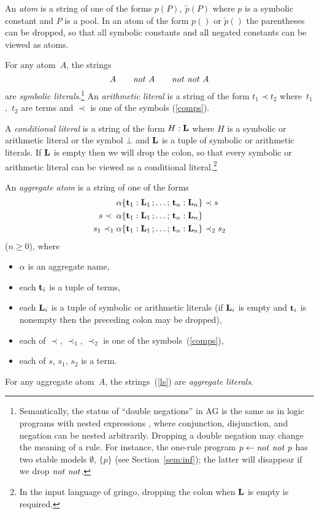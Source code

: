 \documentclass{tlp}
\def\ar{\leftarrow}
\def\beq{\begin{equation}}
\def\eeq#1{\label{#1}\end{equation}}
\def\no{{\it not}}
\begin{document}
An {\sl atom} is a string of one of the forms
$p(P),\ \tilde{p}(P)$
where $p$ is a symbolic constant and $P$ is a pool.
In an atom of the form $p()$ or $\tilde{p}()$ the parentheses can be
dropped, so that all symbolic constants and all negated constants can be viewed
as atoms.

For any atom~$A$, the strings
\beq
A\qquad\no\ A\qquad\no\ \no\ A
\eeq{ls}
are {\sl symbolic literals}.\footnote{Semantically, the status of
``double negations'' in AG is the same as in logic programs with
nested expressions \cite{lif99d}, where conjunction, disjunction, and
negation can be nested arbitrarily.
Dropping a double negation may change the meaning of a rule.  For
instance, the one-rule program $p\ar \no\ \no\ p$ has two stable models
$\emptyset$, $\{p\}$ (see Section~\ref{sem:inf}); the latter will disappear
if we drop $\no\ \no$.} An {\sl arithmetic literal} is
a string of the form $t_1\prec t_2$
where~$t_1$,~$t_2$ are terms and $\prec$ is one of the symbols (\ref{comps}).

A {\sl conditional literal} is a string of the form
$H : {\bf L}$
where $H$ is a symbolic or arithmetic literal or the symbol $\bot$ and
${\bf L}$ is a tuple of symbolic or arithmetic literals.
If ${\bf L}$ is empty then we will drop the colon, so that every symbolic or
arithmetic literal
can be viewed as a conditional literal.\footnote{In the input language of
{\sc gringo}, dropping the colon when ${\bf L}$ is empty is required.}

An {\sl aggregate atom} is a string of one of the forms
\begin{align}
       \alpha\{{\bf t}_1 : {\bf L}_1\,;\ldots;\,{\bf t}_n : {\bf L}_n\}&\prec s
\label{ag1}\\
s\prec\;\alpha\{{\bf t}_1 : {\bf L}_1\,;\ldots;\,{\bf t}_n : {\bf L}_n\}&
\label{ag2}\\
s_1\prec_1\alpha\{{\bf t}_1 : {\bf L}_1\,;\ldots;\,{\bf t}_n : {\bf L}_n\}&
                                                              \prec_2s_2
\label{ag3}
\end{align}
($n\geq 0$),
where
\begin{itemize}
\item
$\alpha$ is an aggregate name,
\item
each ${\bf t}_i$ is a tuple of terms,
\item
each ${\bf L}_i$ is a tuple of symbolic or arithmetic literals (if
${\bf L}_i$ is empty and ${\bf t}_i$ is nonempty then the preceding colon may
be dropped),
\item
each of $\prec$, $\prec_1$, $\prec_2$ is one of the
symbols~(\ref{comps}),
\item
each of $s$, $s_1$, $s_2$  is a term.
\end{itemize}
For any aggregate atom~$A$, the strings~(\ref{ls})
are {\sl aggregate literals}.
\end{document}
